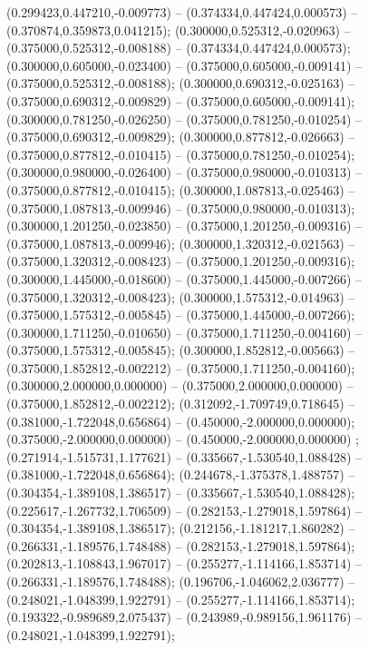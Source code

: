 (0.299423,0.447210,-0.009773) -- (0.374334,0.447424,0.000573) -- (0.370874,0.359873,0.041215);
 (0.300000,0.525312,-0.020963) -- (0.375000,0.525312,-0.008188) -- (0.374334,0.447424,0.000573);
 (0.300000,0.605000,-0.023400) -- (0.375000,0.605000,-0.009141) -- (0.375000,0.525312,-0.008188);
 (0.300000,0.690312,-0.025163) -- (0.375000,0.690312,-0.009829) -- (0.375000,0.605000,-0.009141);
 (0.300000,0.781250,-0.026250) -- (0.375000,0.781250,-0.010254) -- (0.375000,0.690312,-0.009829);
 (0.300000,0.877812,-0.026663) -- (0.375000,0.877812,-0.010415) -- (0.375000,0.781250,-0.010254);
 (0.300000,0.980000,-0.026400) -- (0.375000,0.980000,-0.010313) -- (0.375000,0.877812,-0.010415);
 (0.300000,1.087813,-0.025463) -- (0.375000,1.087813,-0.009946) -- (0.375000,0.980000,-0.010313);
 (0.300000,1.201250,-0.023850) -- (0.375000,1.201250,-0.009316) -- (0.375000,1.087813,-0.009946);
 (0.300000,1.320312,-0.021563) -- (0.375000,1.320312,-0.008423) -- (0.375000,1.201250,-0.009316);
 (0.300000,1.445000,-0.018600) -- (0.375000,1.445000,-0.007266) -- (0.375000,1.320312,-0.008423);
 (0.300000,1.575312,-0.014963) -- (0.375000,1.575312,-0.005845) -- (0.375000,1.445000,-0.007266);
 (0.300000,1.711250,-0.010650) -- (0.375000,1.711250,-0.004160) -- (0.375000,1.575312,-0.005845);
 (0.300000,1.852812,-0.005663) -- (0.375000,1.852812,-0.002212) -- (0.375000,1.711250,-0.004160);
 (0.300000,2.000000,0.000000) -- (0.375000,2.000000,0.000000) -- (0.375000,1.852812,-0.002212);
 (0.312092,-1.709749,0.718645) -- (0.381000,-1.722048,0.656864) -- (0.450000,-2.000000,0.000000);
 (0.375000,-2.000000,0.000000) -- (0.450000,-2.000000,0.000000) ;
 (0.271914,-1.515731,1.177621) -- (0.335667,-1.530540,1.088428) -- (0.381000,-1.722048,0.656864);
 (0.244678,-1.375378,1.488757) -- (0.304354,-1.389108,1.386517) -- (0.335667,-1.530540,1.088428);
 (0.225617,-1.267732,1.706509) -- (0.282153,-1.279018,1.597864) -- (0.304354,-1.389108,1.386517);
 (0.212156,-1.181217,1.860282) -- (0.266331,-1.189576,1.748488) -- (0.282153,-1.279018,1.597864);
 (0.202813,-1.108843,1.967017) -- (0.255277,-1.114166,1.853714) -- (0.266331,-1.189576,1.748488);
 (0.196706,-1.046062,2.036777) -- (0.248021,-1.048399,1.922791) -- (0.255277,-1.114166,1.853714);
 (0.193322,-0.989689,2.075437) -- (0.243989,-0.989156,1.961176) -- (0.248021,-1.048399,1.922791);
